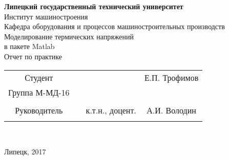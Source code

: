 \documentclass[a4paper,14pt]{article}
\renewcommand{\figurename}{Рисунок}
\begin{document}
\def\figurename{Рисунок}
 
 
 
 
\begin{center}
\hfill \break
\small{\textbf{Липецкий государственный технический университет}}\\
\hfill \break
\normalsize{Институт машиностроения}\\
 \hfill \break
\normalsize{Кафедра оборудования и процессов машиностроительных производств}\\
\hfill\break
\hfill \break
\hfill \break
\hfill \break
\large{Моделирование термических напряжений\\ в пакете Matlab}\\
\hfill \break
\hfill \break
\hfill \break
\normalsize{Отчет по практике}\\

\hfill \break
\hfill \break
\hfill \break
\hfill \break
\end{center}
 
\hfill \break
 
\normalsize{ 
\begin{tabular}{cccc}
\\ Студент & \underline{\hspace{3cm}} &  & Е.П. Трофимов \\  Группа М-МД-16  \\\\
Руководитель & \underline{\hspace{3cm}}& к.т.н., доцент.&  А.И. Володин \\\\
\end{tabular}
}\\
\hfill \break
\hfill \break
\hfill \break
\hfill \break
\hfill \break
\hfill \break
\hfill \break
\hfill \break
\hfill \break
\hfill \break
\begin{center} Липецк, 2017 \end{center}
\thispagestyle{empty} %
 
\end{document}
